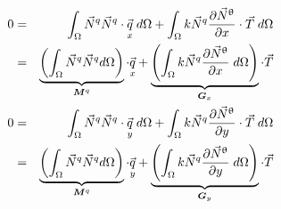 \begin{eqnarray}
0&=& \int_\Omega \vec{N}^q \vec{N}^q \cdot \vec{\underset{\tiny x}{q}} \; d\Omega
+ \int _\Omega k \vec{N}^q   \frac{\partial \vec{N}^\uptheta}{\partial x}\cdot \vec{T} \; d\Omega \nonumber\\ 
&=& \underbrace{\left( \int_\Omega \vec{N}^q \vec{N}^q d\Omega \right)}_{{\bm M}^q}  \cdot \vec{\underset{\tiny x}{q}} 
+ \underbrace{\left(\int _\Omega k \vec{N}^q  \frac{\partial \vec{N}^\uptheta}{\partial x}\; d\Omega\right)}_{{\bm G}_x} \cdot \vec{T} \label{eq:htediff4}\\ 
0&=& \int_\Omega \vec{N}^q \vec{N}^q \cdot \vec{\underset{\tiny y}{q}} \; d\Omega
+ \int _\Omega k \vec{N}^q   \frac{\partial \vec{N}^\uptheta}{\partial y} \cdot \vec{T} \;  d\Omega \nonumber\\ 
&=& \underbrace{\left( \int_\Omega \vec{N}^q \vec{N}^q d\Omega \right)}_{{\bm M}^q}  \cdot \vec{\underset{\tiny y}{q}} 
+ \underbrace{\left(\int _\Omega k \vec{N}^q  \frac{\partial \vec{N}^\uptheta}{\partial y} \; d\Omega\right)}_{{\bm G}_y} \cdot \vec{T} \label{eq:htediff5}
\end{eqnarray}

